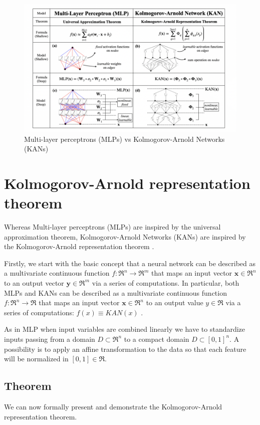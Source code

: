\documentclass[12pt,a4paper]{article}
\begin{document}
\begin{figure}[H]
    \centering
    \includegraphics[width=0.8\linewidth]{Images/MLP-KAN.png}
    \caption{Multi-layer perceptrons (MLPs) vs Kolmogorov-Arnold Networks (KANs)}
    \label{fig:MLPKAN}
\end{figure}

\section{Kolmogorov-Arnold representation theorem}
\label{sec:ka}
Whereas Multi-layer perceptrons (MLPs) are inspired by the universal approximation theorem, Kolmogorov-Arnold Networks (KANs) are inspired by the Kolmogorov-Arnold representation theorem \cite{KAN}.

Firstly, we start with the basic concept that a neural network can be described as a multivariate continuous function $f: \Re^n \rightarrow \Re^m $ that maps an input vector $\textbf{x}\in \Re^n$ to an output vector $\textbf{y}\in \Re^m$ via a series of computations. In particular, both MLPs and KANs can be described as a multivariate continuous function $f: \Re^n \rightarrow \Re $ that maps an input vector $\textbf{x}\in \Re^n$ to an output value $y\in \Re$ via a series of computations: $f(x) \equiv KAN(x)$ \cite{book1NAML, book2NAML}.

As in MLP when input variables are combined linearly we have to standardize inputs passing from a domain $D \subset \Re^n$ to a compact domain $D \subset [0,1]^n $. A possibility is to apply an affine transformation to the data so that each feature will be normalized in $[0,1] \in 
 \Re$.

\subsection{Theorem}
We can now formally present and demonstrate the Kolmogorov-Arnold representation theorem. 
\end{document}

